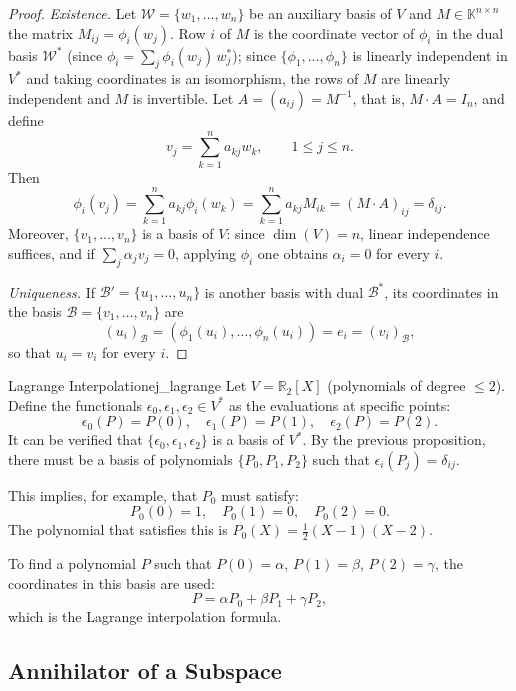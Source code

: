 \documentclass[11pt, a4paper]{article}
\begin{document}
\begin{proof}
\textit{Existence.} Let $\mathcal{W} = \{w_1, \dots, w_n\}$ be an auxiliary basis of $V$ and $M \in \mathbb{K}^{n \times n}$ the matrix $M_{ij} = \phi_i(w_j)$. Row $i$ of $M$ is the coordinate vector of $\phi_i$ in the dual basis $\mathcal{W}^*$ (since $\phi_i = \sum_j \phi_i(w_j)\, w_j^*$); since $\{\phi_1, \dots, \phi_n\}$ is linearly independent in $V^*$ and taking coordinates is an isomorphism, the rows of $M$ are linearly independent and $M$ is invertible. Let $A = (a_{ij}) = M^{-1}$, that is, $M \cdot A = I_n$, and define
\[
v_j = \sum_{k=1}^n a_{kj} w_k, \qquad 1 \le j \le n.
\]
Then
\[
\phi_i(v_j) = \sum_{k=1}^n a_{kj} \phi_i(w_k) = \sum_{k=1}^n a_{kj} M_{ik} = (M \cdot A)_{ij} = \delta_{ij}.
\]
Moreover, $\{v_1, \dots, v_n\}$ is a basis of $V$: since $\dim(V) = n$, linear independence suffices, and if $\sum_j \alpha_j v_j = 0$, applying $\phi_i$ one obtains $\alpha_i = 0$ for every $i$.

\textit{Uniqueness.} If $\mathcal{B}' = \{u_1, \dots, u_n\}$ is another basis with dual $\mathcal{B}^*$, its coordinates in the basis $\mathcal{B} = \{v_1, \dots, v_n\}$ are
\[
(u_i)_{\mathcal{B}} = (\phi_1(u_i), \dots, \phi_n(u_i)) = e_i = (v_i)_{\mathcal{B}},
\]
so that $u_i = v_i$ for every $i$.
\end{proof}

\begin{ejemplo}{Lagrange Interpolation}{ej_lagrange}
Let $V = \mathbb{R}_2[X]$ (polynomials of degree $\le 2$). Define the functionals $\epsilon_0, \epsilon_1, \epsilon_2 \in V^*$ as the evaluations at specific points:
\[
\epsilon_0(P) = P(0), \quad \epsilon_1(P) = P(1), \quad \epsilon_2(P) = P(2).
\]
It can be verified that $\{\epsilon_0, \epsilon_1, \epsilon_2\}$ is a basis of $V^*$. By the previous proposition, there must be a basis of polynomials $\{P_0, P_1, P_2\}$ such that $\epsilon_i(P_j) = \delta_{ij}$.

This implies, for example, that $P_0$ must satisfy:
\[
P_0(0)=1, \quad P_0(1)=0, \quad P_0(2)=0.
\]
The polynomial that satisfies this is $P_0(X) = \frac{1}{2}(X-1)(X-2)$.

To find a polynomial $P$ such that $P(0)=\alpha$, $P(1)=\beta$, $P(2)=\gamma$, the coordinates in this basis are used:
\[
P = \alpha P_0 + \beta P_1 + \gamma P_2,
\]
which is the Lagrange interpolation formula.
\end{ejemplo}

\subsection{Annihilator of a Subspace}
\end{document}
